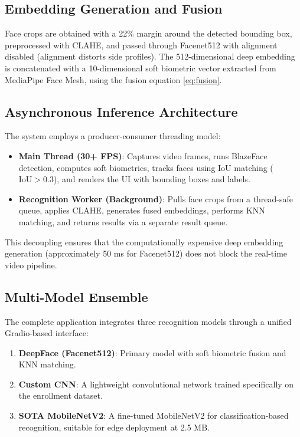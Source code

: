 \documentclass[conference]{IEEEtran}
\begin{document}
\subsection{Embedding Generation and Fusion}

Face crops are obtained with a 22\% margin around the detected bounding box, preprocessed with CLAHE, and passed through Facenet512 with alignment disabled (alignment distorts side profiles). The 512-dimensional deep embedding is concatenated with a 10-dimensional soft biometric vector extracted from MediaPipe Face Mesh, using the fusion equation \eqref{eq:fusion}.

\subsection{Asynchronous Inference Architecture}

The system employs a producer-consumer threading model:

\begin{itemize}
\item \textbf{Main Thread (30+ FPS)}: Captures video frames, runs BlazeFace detection, computes soft biometrics, tracks faces using IoU matching ($\text{IoU} > 0.3$), and renders the UI with bounding boxes and labels.
\item \textbf{Recognition Worker (Background)}: Pulls face crops from a thread-safe queue, applies CLAHE, generates fused embeddings, performs KNN matching, and returns results via a separate result queue.
\end{itemize}

This decoupling ensures that the computationally expensive deep embedding generation (approximately 50 ms for Facenet512) does not block the real-time video pipeline.

\subsection{Multi-Model Ensemble}

The complete application integrates three recognition models through a unified Gradio-based interface:
\begin{enumerate}
\item \textbf{DeepFace (Facenet512)}: Primary model with soft biometric fusion and KNN matching.
\item \textbf{Custom CNN}: A lightweight convolutional network trained specifically on the enrollment dataset.
\item \textbf{SOTA MobileNetV2}: A fine-tuned MobileNetV2 for classification-based recognition, suitable for edge deployment at 2.5 MB.
\end{enumerate}
\end{document}
